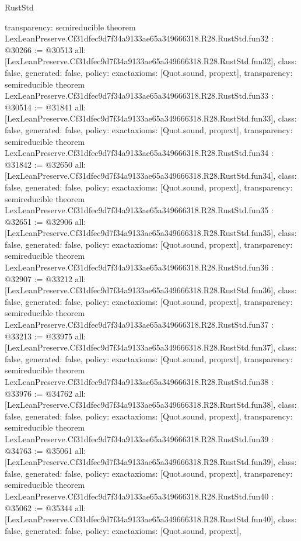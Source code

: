 \begin{lexlean}{RustStd}
\begin{coremodule}
{  transparency: semireducible
}
theorem LexLeanPreserve.Cf31dfec9d7f34a9133ae65a349666318.R28.RustStd.fun32 : @30266 := @30513 {
  all: [LexLeanPreserve.Cf31dfec9d7f34a9133ae65a349666318.R28.RustStd.fun32],
  class: false,
  generated: false,
  policy: exact{axioms: [Quot.sound, propext]},
  transparency: semireducible
}
theorem LexLeanPreserve.Cf31dfec9d7f34a9133ae65a349666318.R28.RustStd.fun33 : @30514 := @31841 {
  all: [LexLeanPreserve.Cf31dfec9d7f34a9133ae65a349666318.R28.RustStd.fun33],
  class: false,
  generated: false,
  policy: exact{axioms: [Quot.sound, propext]},
  transparency: semireducible
}
theorem LexLeanPreserve.Cf31dfec9d7f34a9133ae65a349666318.R28.RustStd.fun34 : @31842 := @32650 {
  all: [LexLeanPreserve.Cf31dfec9d7f34a9133ae65a349666318.R28.RustStd.fun34],
  class: false,
  generated: false,
  policy: exact{axioms: [Quot.sound, propext]},
  transparency: semireducible
}
theorem LexLeanPreserve.Cf31dfec9d7f34a9133ae65a349666318.R28.RustStd.fun35 : @32651 := @32906 {
  all: [LexLeanPreserve.Cf31dfec9d7f34a9133ae65a349666318.R28.RustStd.fun35],
  class: false,
  generated: false,
  policy: exact{axioms: [Quot.sound, propext]},
  transparency: semireducible
}
theorem LexLeanPreserve.Cf31dfec9d7f34a9133ae65a349666318.R28.RustStd.fun36 : @32907 := @33212 {
  all: [LexLeanPreserve.Cf31dfec9d7f34a9133ae65a349666318.R28.RustStd.fun36],
  class: false,
  generated: false,
  policy: exact{axioms: [Quot.sound, propext]},
  transparency: semireducible
}
theorem LexLeanPreserve.Cf31dfec9d7f34a9133ae65a349666318.R28.RustStd.fun37 : @33213 := @33975 {
  all: [LexLeanPreserve.Cf31dfec9d7f34a9133ae65a349666318.R28.RustStd.fun37],
  class: false,
  generated: false,
  policy: exact{axioms: [Quot.sound, propext]},
  transparency: semireducible
}
theorem LexLeanPreserve.Cf31dfec9d7f34a9133ae65a349666318.R28.RustStd.fun38 : @33976 := @34762 {
  all: [LexLeanPreserve.Cf31dfec9d7f34a9133ae65a349666318.R28.RustStd.fun38],
  class: false,
  generated: false,
  policy: exact{axioms: [Quot.sound, propext]},
  transparency: semireducible
}
theorem LexLeanPreserve.Cf31dfec9d7f34a9133ae65a349666318.R28.RustStd.fun39 : @34763 := @35061 {
  all: [LexLeanPreserve.Cf31dfec9d7f34a9133ae65a349666318.R28.RustStd.fun39],
  class: false,
  generated: false,
  policy: exact{axioms: [Quot.sound, propext]},
  transparency: semireducible
}
theorem LexLeanPreserve.Cf31dfec9d7f34a9133ae65a349666318.R28.RustStd.fun40 : @35062 := @35344 {
  all: [LexLeanPreserve.Cf31dfec9d7f34a9133ae65a349666318.R28.RustStd.fun40],
  class: false,
  generated: false,
  policy: exact{axioms: [Quot.sound, propext]},
}
\end{coremodule}
\end{lexlean}
